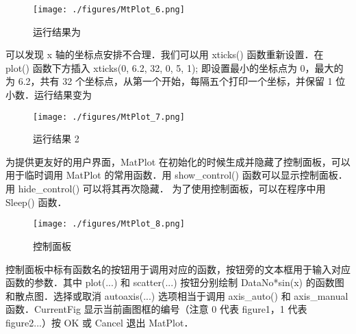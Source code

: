 \begin{figure}[ht]
\centering
\texttt{[image: ./figures/MtPlot\_6.png]}
\caption{运行结果为} \label{MtPlot_fig6}
\end{figure}

可以发现 x 轴的坐标点安排不合理．我们可以用 xticks() 函数重新设置．在 plot() 函数下方插入
xticks(0, 6.2, 32, 0, 5, 1);
即设置最小的坐标点为 0，最大的为 6.2，共有 32 个坐标点，从第一个开始，每隔五个打印一个坐标，并保留 1 位小数．运行结果变为

\begin{figure}[ht]
\centering
\texttt{[image: ./figures/MtPlot\_7.png]}
\caption{运行结果 2} \label{MtPlot_fig7}
\end{figure}

为提供更友好的用户界面，MatPlot 在初始化的时候生成并隐藏了控制面板，可以用于临时调用 MatPlot 的常用函数．用 show_control() 函数可以显示控制面板．用 hide_control() 可以将其再次隐藏． 为了使用控制面板，可以在程序中用 Sleep() 函数．

\begin{figure}[ht]
\centering
\texttt{[image: ./figures/MtPlot\_8.png]}
\caption{控制面板} \label{MtPlot_fig8}
\end{figure}

控制面板中标有函数名的按钮用于调用对应的函数，按钮旁的文本框用于输入对应函数的参数．其中 plot(...) 和 scatter(...) 按钮分别绘制 DataNo*sin(x) 的函数图和散点图．选择或取消 autoaxis(...) 选项相当于调用 axis_auto() 和 axis_manual 函数．CurrentFig 显示当前画图框的编号（注意 0 代表 figure1，1 代表 figure2...）按 OK 或 Cancel 退出 MatPlot．
